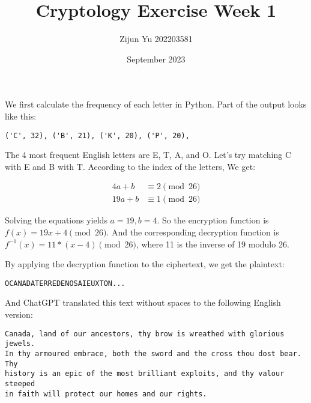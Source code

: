 \documentclass{article}
\title{Cryptology Exercise Week 1}
\author{Zijun Yu 202203581}
\date{September 2023}
\begin{document}
\maketitle

We first calculate the frequency of each letter in Python. Part of the output looks like this:

\begin{verbatim}
('C', 32), ('B', 21), ('K', 20), ('P', 20),
\end{verbatim}

The 4 most frequent English letters are E, T, A, and O. Let's try matching C with E and B with T.
According to the index of the letters, We get:

\begin{align*}
    4a + b  & \equiv 2 \pmod{26} \\
    19a + b & \equiv 1 \pmod{26}
\end{align*}

Solving the equations yields $a = 19, b = 4$. So the encryption function is $f(x) = 19 x + 4 \pmod{26}$. And the corresponding
decryption function is $f^{-1}(x) = 11 * (x - 4) \pmod{26}$, where 11 is the inverse of 19 modulo 26.

By applying the decryption function to the ciphertext, we get the plaintext:

\begin{verbatim}
OCANADATERREDENOSAIEUXTON...
\end{verbatim}

And ChatGPT translated this text without spaces to the following English version:

\begin{verbatim}
Canada, land of our ancestors, thy brow is wreathed with glorious jewels.
In thy armoured embrace, both the sword and the cross thou dost bear. Thy
history is an epic of the most brilliant exploits, and thy valour steeped
in faith will protect our homes and our rights.
\end{verbatim}
\end{document}
